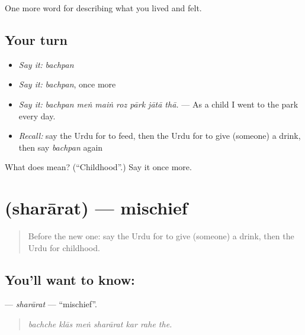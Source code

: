 \begin{grammarlens}[title={What you've built}]
One more word for describing what you lived and felt.
\end{grammarlens}

\subsection*{Your turn}
\begin{itemize}
\raggedright
  \item \emph{Say it:} \emph{bachpan}
  \item \emph{Say it:} \emph{bachpan}, once more
  \item \emph{Say it:} \emph{bachpan meṅ maiṅ roz pārk jātā thā.} — As a child I went to the park every day.
  \item \emph{Recall:} say the Urdu for to feed, then the Urdu for to give (someone) a drink, then say \emph{bachpan} again
\end{itemize}

\begin{tcolorbox}[breakable,colback=teal!4,colframe=teal!35!black,title={Before you move on}]
What does  mean? (\textquotedblleft{}Childhood\textquotedblright{}.) Say it once more.
\end{tcolorbox}
\section[\texorpdfstring{\ur{شرارت} (sharārat)}{شرارت (sharārat)}]{ (sharārat) — mischief}

\label{lesson:UR-C485-shararat}



\begin{quote}
Before the new one: say the Urdu for to give (someone) a drink, then the Urdu for childhood.
\end{quote}

\subsection*{You'll want to know: }
\textbf{} — \emph{sharārat} — \textquotedblleft{}mischief\textquotedblright{}.

\begin{quote}
      
\end{quote}

\begin{quote}
\emph{bachche klās meṅ sharārat kar rahe the.}
\end{quote}

